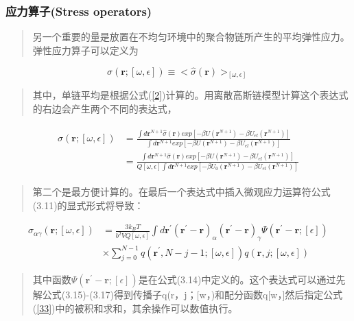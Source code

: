 \subsubsection{应力算子(Stress operators)}
\begin{quotation}
	另一个重要的量是放置在不均匀环境中的聚合物链所产生的平均弹性应力。弹性应力算子可以定义为
\end{quotation}
\begin{equation}\label{31}
\sigma(\mathbf{\mathbf{r}};[\omega,\epsilon])\equiv<\hat{\sigma}(\mathbf{r})>_[\omega,\epsilon]
\end{equation}
\begin{quotation}
	其中，单链平均是根据公式(\ref{2})计算的。用离散高斯链模型计算这个表达式的右边会产生两个不同的表达式，
\end{quotation}
\begin{align}\label{32}
\begin{split}
\sigma(\mathbf{r};[\omega,\epsilon])&=\frac{\int d\mathbf{r}^{N+1}\hat{\sigma}(\mathbf{r})exp[-\beta U(\mathbf{r}^{N+1})-\beta U_{el}(\mathbf{r}^{N+1})]}{\int d\mathbf{r}^{N+1}exp[-\beta U(\mathbf{r}^{N+1})-\beta U_{el}(\mathbf{r}^{N+1})]}\\&=\frac{\int d\mathbf{r}^{N+1}\hat{\sigma}(\mathbf{r})exp[-\beta U(\mathbf{r}^{N+1})-\beta U_{el}(\mathbf{r}^{N+1})]}{Q[\omega,\epsilon]\int d\mathbf{r}^{N+1}exp[-\beta U_0(\mathbf{r}^{N+1})-\beta U_{el}(\mathbf{r}^{N+1})]}
\end{split}
\end{align}
\begin{quotation}
	第二个是最方便计算的。在最后一个表达式中插入微观应力运算符公式(3.11)的显式形式将导致：
\end{quotation}
\begin{equation}
\begin{aligned}\label{33}
\sigma_{\alpha \gamma}(\mathbf{r};[\omega,\epsilon])&=\frac{3k_BT}{b^2VQ[\omega,\epsilon]} \int d\mathbf{r}^{'}(\mathbf{r}^{'}-\mathbf{r})_{\alpha} (\mathbf{r}^{'}-\mathbf{r})_{\gamma} \varPsi (\mathbf{r}^{'}-\mathbf{r};[\epsilon])\\&\times \sum_{j=0}^{N-1}q(\mathbf{r}^{'},N-j-1;[\omega,\epsilon])q(\mathbf{r},j;[\omega,\epsilon])
\end{aligned}
\end{equation}
\begin{quotation}
	其中函数$\varPsi (\mathbf{r}^{'}-\mathbf{r};[\epsilon])$是在公式(3.14)中定义的。这个表达式可以通过先解公式(3.15)-(3.17)得到传播子q(r，j；[w，)和配分函数q[w，]然后指定公式(\ref{33})中的被积和求和，其余操作可以数值执行。
\end{quotation}
